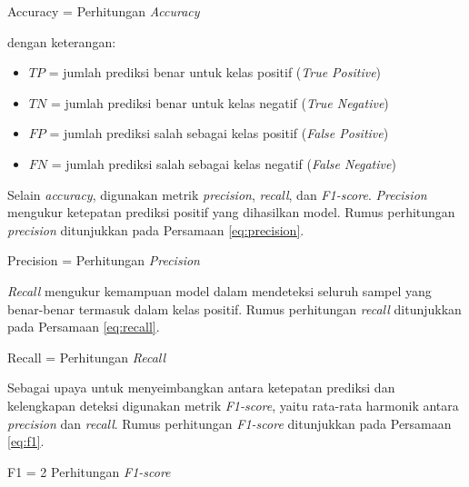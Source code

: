 \begin{equationcaptioned}[eq:accuracy]{
Accuracy = 
}{
Perhitungan \textit{Accuracy}
}
\end{equationcaptioned}

dengan keterangan:
\begin{itemize}
  \renewcommand{\labelitemi}{}
  \item $TP$ = jumlah prediksi benar untuk kelas positif (\textit{True Positive})
  \item $TN$ = jumlah prediksi benar untuk kelas negatif (\textit{True Negative})
  \item $FP$ = jumlah prediksi salah sebagai kelas positif (\textit{False Positive})
  \item $FN$ = jumlah prediksi salah sebagai kelas negatif (\textit{False Negative})
\end{itemize}

Selain \textit{accuracy}, digunakan metrik \textit{precision}, \textit{recall}, dan \textit{F1-score}. 
\textit{Precision} mengukur ketepatan prediksi positif yang dihasilkan model. 
Rumus perhitungan \textit{precision} ditunjukkan pada Persamaan \ref{eq:precision}.

\begin{equationcaptioned}[eq:precision]{
Precision = 
}{
Perhitungan \textit{Precision}
}
\end{equationcaptioned}

\textit{Recall} mengukur kemampuan model dalam mendeteksi seluruh sampel yang benar-benar termasuk dalam kelas positif. 
Rumus perhitungan \textit{recall} ditunjukkan pada Persamaan \ref{eq:recall}.

\begin{equationcaptioned}[eq:recall]{
Recall = 
}{
Perhitungan \textit{Recall}
}
\end{equationcaptioned}

Sebagai upaya untuk menyeimbangkan antara ketepatan prediksi dan kelengkapan deteksi digunakan metrik \textit{F1-score}, yaitu rata-rata harmonik antara \textit{precision} dan \textit{recall}. 
Rumus perhitungan \textit{F1-score} ditunjukkan pada Persamaan \ref{eq:f1}.

\begin{equationcaptioned}[eq:f1]{
F1 = 2 \times {}
}{
Perhitungan \textit{F1-score}
}
\end{equationcaptioned}

